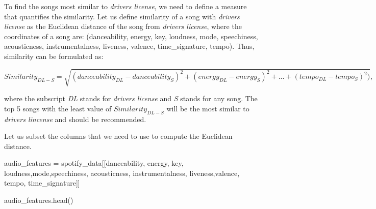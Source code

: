 \documentclass[
  letterpaper,
  DIV=11,
  numbers=noendperiod]{scrreprt}
\newenvironment{Shaded}{\begin{snugshade}}{\end{snugshade}}
\newcommand{\NormalTok}[1]{\textcolor[rgb]{0.00,0.23,0.31}{#1}}
\newcommand{\OperatorTok}[1]{\textcolor[rgb]{0.37,0.37,0.37}{#1}}
\newcommand{\StringTok}[1]{\textcolor[rgb]{0.13,0.47,0.30}{#1}}
\begin{document}
To find the songs most similar to \emph{drivers license}, we need to
define a measure that quantifies the similarity. Let us define
similarity of a song with \emph{drivers license} as the Euclidean
distance of the song from \emph{drivers license}, where the coordinates
of a song are: (danceability, energy, key, loudness, mode, speechiness,
acousticness, instrumentalness, liveness, valence, time\_signature,
tempo). Thus, similarity can be formulated as:

\[Similarity_{DL-S} = \sqrt{(danceability_{DL}-danceability_{S})^2+(energy_{DL}-energy_{S})^2 +...+ (tempo_{DL}-tempo_{S})^2)},\]

where the subscript \emph{DL} stands for \emph{drivers license} and
\emph{S} stands for any song. The top 5 songs with the least value of
\(Similarity_{DL-S}\) will be the most similar to \emph{drivers
lincense} and should be recommended.

Let us subset the columns that we need to use to compute the Euclidean
distance.

\begin{Shaded}
\begin{Highlighting}[]
\NormalTok{audio\_features }\OperatorTok{=}\NormalTok{ spotify\_data[[}\StringTok{\textquotesingle{}danceability\textquotesingle{}}\NormalTok{, }\StringTok{\textquotesingle{}energy\textquotesingle{}}\NormalTok{, }\StringTok{\textquotesingle{}key\textquotesingle{}}\NormalTok{, }\StringTok{\textquotesingle{}loudness\textquotesingle{}}\NormalTok{,}\StringTok{\textquotesingle{}mode\textquotesingle{}}\NormalTok{,}\StringTok{\textquotesingle{}speechiness\textquotesingle{}}\NormalTok{,}
                               \StringTok{\textquotesingle{}acousticness\textquotesingle{}}\NormalTok{, }\StringTok{\textquotesingle{}instrumentalness\textquotesingle{}}\NormalTok{, }\StringTok{\textquotesingle{}liveness\textquotesingle{}}\NormalTok{,}\StringTok{\textquotesingle{}valence\textquotesingle{}}\NormalTok{, }\StringTok{\textquotesingle{}tempo\textquotesingle{}}\NormalTok{, }\StringTok{\textquotesingle{}time\_signature\textquotesingle{}}\NormalTok{]]}
\end{Highlighting}
\end{Shaded}

\begin{Shaded}
\begin{Highlighting}[]
\NormalTok{audio\_features.head()}
\end{Highlighting}
\end{Shaded}
\end{document}
